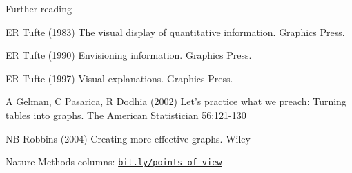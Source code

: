 \documentclass[aspectratio=169,12pt,t]{beamer}
\begin{document}
\begin{frame}{Further reading}

\vspace{-12pt}

  \bbi
\item ER Tufte (1983) The visual display of quantitative information.
Graphics Press.
\item ER Tufte (1990) Envisioning information. Graphics Press.
\item ER Tufte (1997) Visual explanations. Graphics Press.

\vspace{12pt}

\item A Gelman, C Pasarica, R Dodhia (2002) Let's practice what we preach:
Turning tables into graphs. The American Statistician 56:121-130

\vspace{12pt}

\item NB Robbins (2004) Creating more effective graphs. Wiley

\vspace{12pt}

\item Nature Methods columns: \href{https://bit.ly/points_of_view}{\tt bit.ly/points\_of\_view}
\ei

\note{
}
\end{frame}
\end{document}
